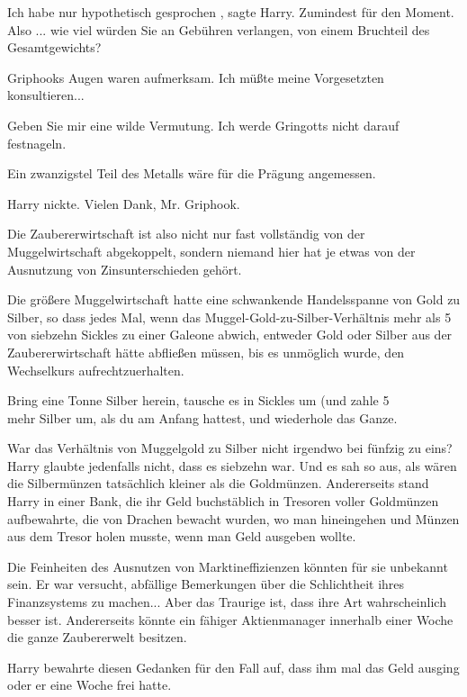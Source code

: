 \glqq Ich habe nur hypothetisch gesprochen\grqq{} , sagte Harry. Zumindest für den Moment. \glqq Also ... wie
viel würden Sie an Gebühren verlangen, von einem Bruchteil des Gesamtgewichts?\grqq{}

Griphooks Augen waren
aufmerksam. \glqq Ich müßte meine Vorgesetzten konsultieren...\grqq{}

\glqq Geben Sie mir eine wilde
Vermutung. Ich werde Gringotts nicht darauf festnageln.\grqq{}

 \glqq Ein zwanzigstel Teil des Metalls wäre
für die Prägung angemessen.\grqq{}

Harry nickte. \glqq Vielen Dank, Mr. Griphook.\grqq{}

Die
Zaubererwirtschaft ist also nicht nur fast vollständig von der Muggelwirtschaft abgekoppelt, sondern niemand hier hat je
etwas von der Ausnutzung von Zinsunterschieden gehört.

Die größere Muggelwirtschaft hatte eine schwankende
Handelsspanne von Gold zu Silber, so dass jedes Mal, wenn das Muggel-Gold-zu-Silber-Verhältnis mehr als 5\\%
von siebzehn Sickles zu einer Galeone abwich, entweder Gold oder Silber aus der Zaubererwirtschaft hätte abfließen
müssen, bis es unmöglich wurde, den Wechselkurs aufrechtzuerhalten.

Bring eine Tonne Silber herein, tausche
es in Sickles um (und zahle 5\\%
mehr Silber um, als du am Anfang hattest, und wiederhole das Ganze.

War das Verhältnis von Muggelgold zu
Silber nicht irgendwo bei fünfzig zu eins? Harry glaubte jedenfalls nicht, dass es siebzehn war. Und es sah so aus, als
wären die Silbermünzen tatsächlich kleiner als die Goldmünzen. Andererseits stand Harry in einer Bank, die ihr Geld
buchstäblich in Tresoren voller Goldmünzen aufbewahrte, die von Drachen bewacht wurden, wo man hineingehen und Münzen
aus dem Tresor holen musste, wenn man Geld ausgeben wollte.

Die Feinheiten des Ausnutzen von
Marktineffizienzen könnten für sie unbekannt sein. Er war versucht, abfällige Bemerkungen über die Schlichtheit ihres
Finanzsystems zu machen... Aber das Traurige ist, dass ihre Art wahrscheinlich besser ist. Andererseits könnte ein
fähiger Aktienmanager innerhalb einer Woche die ganze Zaubererwelt besitzen.

Harry bewahrte diesen Gedanken
für den Fall auf, dass ihm mal das Geld ausging oder er eine Woche frei hatte.

